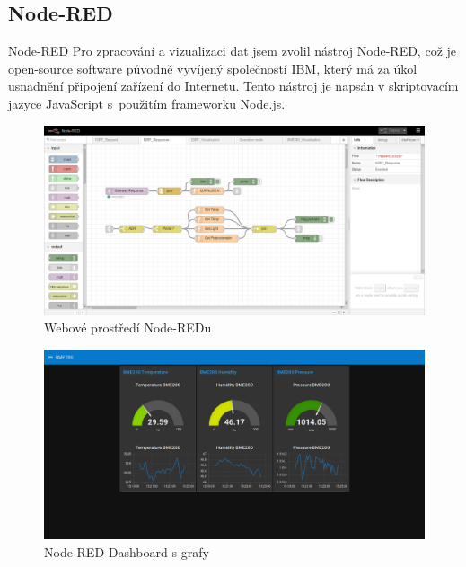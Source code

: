 \documentclass[11pt]{beamer}
\begin{document}
\subsection{Node-RED}

\begin{frame}{Node-RED}
  Pro zpracování a vizualizaci dat jsem zvolil nástroj Node-RED, což je open-source software původně vyvíjený společností IBM, který má za úkol usnadnění připojení zařízení do Internetu. Tento nástroj je napsán v skriptovacím jazyce JavaScript s~použitím frameworku Node.js.
  \begin{center}
      \begin{figure}
        \includegraphics[width = \textwidth]{../img/node-red.png}
        \caption{Webové prostředí Node-REDu}
      \end{figure}
    \endminipage
      \begin{figure}
        \includegraphics[width = \textwidth]{../img/node-red_dashboard.png}
        \caption{Node-RED Dashboard s grafy}
      \end{figure}
    \endminipage
  \end{center}
\end{frame}
\end{document}
